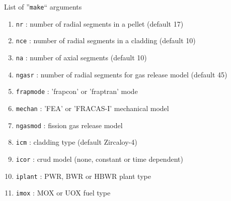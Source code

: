 \begin{frame}{List of ''\texttt{make}`` arguments}
  
  \footnotesize

  \begin{block}{}
    \begin{enumerate}
    \item \texttt{nr}       : number of radial segments in a pellet (default 17)
    \item \texttt{nce}      : number of radial segments in a cladding (default 10)
    \item \texttt{na}       : number of axial segments (default 10)
    \item \texttt{ngasr}    : number of radial segments for gas release model (default 45)
    \item \texttt{frapmode} : 'frapcon' or 'fraptran' mode
    \item \texttt{mechan}   : 'FEA' or 'FRACAS-I' mechanical model
    \item \texttt{ngasmod}  : fission gas release model
    \item \texttt{icm}      : cladding type (default Zircaloy-4)
    \item \texttt{icor}     : crud model (none, constant or time dependent)
    \item \texttt{iplant}   : PWR, BWR or HBWR plant type
    \item \texttt{imox}     : MOX or UOX fuel type
    \end{enumerate}
  \end{block}

\end{frame}


